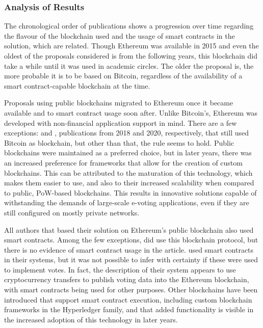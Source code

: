 \documentclass[../access.tex]{subfiles}
\begin{document}
\subsubsection{Analysis of Results}
\label{results-blockchain-characteristics}
The chronological order of publications shows a progression over time regarding the flavour of the blockchain used and the usage of smart contracts in the solution, which are related. Though Ethereum was available in 2015 and even the oldest of the proposals considered is from the following years, this blockchain did take a while until it was used in academic circles. The older the proposal is, the more probable it is to be based on Bitcoin, regardless of the availability of a smart contract-capable blockchain at the time.
\par
Proposals using public blockchains migrated to Ethereum once it became available and to smart contract usage soon after. Unlike Bitcoin's, Ethereum was developed with non-financial application support in mind. There are a few exceptions: \cite{Bartolucci2018} and \cite{Dimitriou2020}, publications from 2018 and 2020, respectively, that still used Bitcoin as blockchain, but other than that, the rule seems to hold. Public blockchains were maintained as a preferred choice, but in later years, there was an increased preference for frameworks that allow for the creation of custom blockchains. This can be attributed to the maturation of this technology, which makes them easier to use, and also to their increased scalability when compared to public, PoW-based blockchains. This results in innovative solutions capable of withstanding the demands of large-scale e-voting applications, even if they are still configured on mostly private networks.
\par
All authors that based their solution on Ethereum's public blockchain also used smart contracts. Among the few exceptions, \cite{Hardwick2018} did use this blockchain protocol, but there is no evidence of smart contract usage in the article. \cite{Lai2018} used smart contracts in their systems, but it was not possible to infer with certainty if these were used to implement votes. In fact, the description of their system appears to use cryptocurrency transfers to publish voting data into the Ethereum blockchain, with smart contracts being used for other purposes. Other blockchains have been introduced that support smart contract execution, including custom blockchain frameworks in the Hyperledger family, and that added functionality is visible in the increased adoption of this technology in later years.
\end{document}
